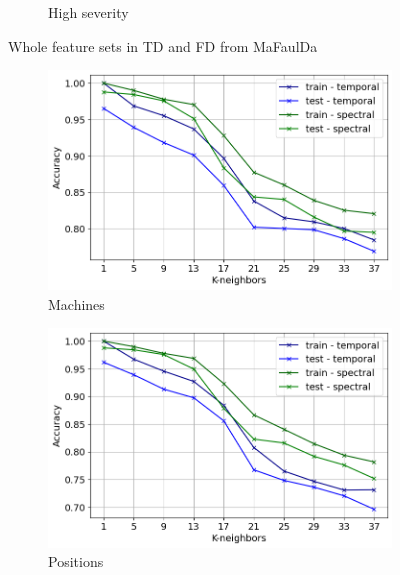 \documentclass{llncs}
\begin{document}
\begin{figure}
\begin{subfigure}[b]{0.32\textwidth}
         \caption{High severity}
     \end{subfigure}
     \caption{Whole feature sets in TD and FD from MaFaulDa}
\end{figure}



\begin{figure}
     \begin{subfigure}[b]{0.32\textwidth}
         \centering
         \includegraphics[width=\textwidth]{fig/all-features-pumps/machine.png}
         \caption{Machines}
     \end{subfigure}
     \hfill
     \begin{subfigure}[b]{0.32\textwidth}
         \centering
         \includegraphics[width=\textwidth]{fig/all-features-pumps/position.png}
         \caption{Positions}
     \end{subfigure}
     \hfill
     \begin{subfigure}[b]{0.32\textwidth}

\end{subfigure}
\end{figure}
\end{document}
